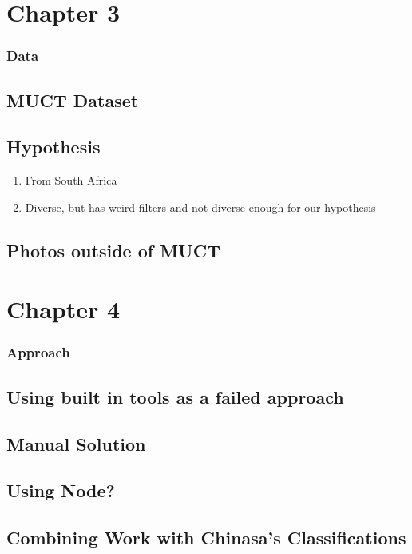 \documentclass{article}
\begin{document}
\section*{Chapter 3}

\subsubsection*{Data}

\subsection{MUCT Dataset}
\subsection{Hypothesis}
	\begin{enumerate}
		\item From South Africa
		\item Diverse, but has weird filters and not diverse enough for our hypothesis
	\end{enumerate}
\subsection{Photos outside of MUCT}

\newpage

\setcounter{section}{4}
\setcounter{subsection}{0}
\section*{Chapter 4}

\subsubsection*{Approach}

\subsection{Using built in tools as a failed approach}
\subsection{Manual Solution}
\subsection{Using Node?}
\subsection{Combining Work with Chinasa's Classifications}
\end{document}
